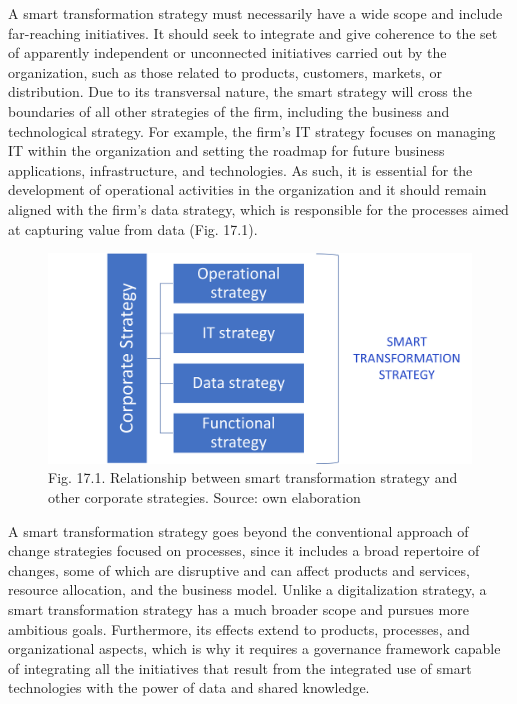 \documentclass[
  letterpaper,
  DIV=11,
  numbers=noendperiod]{scrreprt}
\begin{document}
A smart transformation strategy must necessarily have a wide scope and
include far-reaching initiatives. It should seek to integrate and give
coherence to the set of apparently independent or unconnected
initiatives carried out by the organization, such as those related to
products, customers, markets, or distribution. Due to its transversal
nature, the smart strategy will cross the boundaries of all other
strategies of the firm, including the business and technological
strategy. For example, the firm's IT strategy focuses on managing IT
within the organization and setting the roadmap for future business
applications, infrastructure, and technologies. As such, it is essential
for the development of operational activities in the organization and it
should remain aligned with the firm's data strategy, which is
responsible for the processes aimed at capturing value from data (Fig.
17.1).

\begin{figure}

{\centering \includegraphics[width=6.25in,height=\textheight]{img/fig27.png}

}

\caption{Fig. 17.1. Relationship between smart transformation strategy
and other corporate strategies. Source: own elaboration}

\end{figure}

A smart transformation strategy goes beyond the conventional approach of
change strategies focused on processes, since it includes a broad
repertoire of changes, some of which are disruptive and can affect
products and services, resource allocation, and the business model.
Unlike a digitalization strategy, a smart transformation strategy has a
much broader scope and pursues more ambitious goals. Furthermore, its
effects extend to products, processes, and organizational aspects, which
is why it requires a governance framework capable of integrating all the
initiatives that result from the integrated use of smart technologies
with the power of data and shared knowledge.
\end{document}
